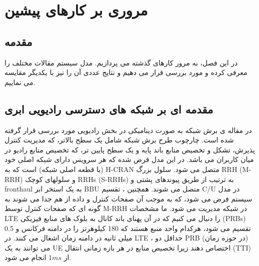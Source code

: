 \chapter{مروری بر کارهای پیشین}

\section{مقدمه}
در این فصل، به مرور کارهای گذشته می پردازیم.
مدل سیستم مقالات مختلف را معرفی کرده و مورد بررسی قرار می دهیم و نتایج عددی آن را نیز با یکدیگر مقایسه می نماییم.
\section{مقدمه ای بر شبکه های دسترسی رادیویی ابری}
در مقاله ی \cite{lee2018dynamic}
برش شبکه به صورت دینامیکی در بخش رادیویی مورد بررسی قرار گرفته شده است.
چارچوب طرح برش شبکه شامل یک سطح بالاتر، که مدیریت کنترل پذیرش، تشکل و تخصیص منابع باند پایه و یک سطح پایین تر، که تخصیص منابع رادیو در میان کاربران می باشد.
در این مدل فرض شده که هر سرویس دارای شبکه اصلی خود (یا قطعه اصلی شبکه) است که به H-CRAN متصل می شود.
سلول بزرگ RRH (M-RRH) و سلولهای کوچک RRHs (S-RRHs) به ترتیب از طریق پیوندهای پشتی و fronthaul به یک استخر ابر
BBU  متصل می شوند.
همچنین ، تقسیم C/U در مدل سیستم فرض می شود، که به موجب آن صفحات کنترل و داده از هم جدا می شوند به گونه ای که صفحات کنترل توسط M-RRH در شبکه مدیریت می شود.
ما مشخصات LTE را دنبال می کنیم که در آن پهنای باند کانال به بلوک های منابع فیزیکی (PRBs) تقسیم می شود، هرکدام واحد منبع هستند که 180 کیلوهرتز را در دامنه فرکانس و 0.5 میلی ثانیه در دامنه زمان اشغال می کنند.
در LTE ، حداقل دو PRB (در حوزه زمان) می توانند به یک UE اختصاص دهند زیرا تخصیص منابع در هر بازه زمانی انتقال (TTI) از
$1ms$
 انجام می شود.
